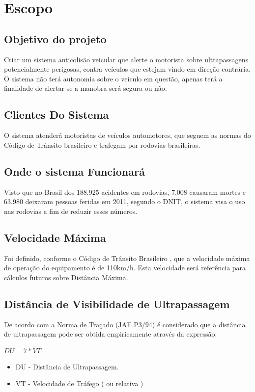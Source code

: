 \chapter[Escopo]{Escopo}

\section{Objetivo do projeto}
Criar um sistema anticolisão veicular que alerte o motorista sobre ultrapassagens potencialmente perigosas, contra veículos que estejam vindo em direção contrária.
O sistema não terá autonomia sobre o veículo em questão, apenas terá a finalidade de alertar se a manobra será segura ou não.

\section{Clientes Do Sistema}
O sistema atenderá motoristas de veículos automotores, que seguem as normas do Código de Trânsito brasileiro e trafegam por rodovias brasileiras.

\section{Onde o sistema Funcionará}
Visto que no Brasil dos 188.925 acidentes em rodovias, 7.008 causaram mortes e 63.980 deixaram pessoas feridas em 2011, segundo o DNIT, o sistema visa o uso nas rodovias a fim de reduzir esses números. \cite{ministerio}

\section{Velocidade Máxima}
Foi definido, conforme o Código de Trânsito Brasileiro \cite{ctb}, que a velocidade máxima de operação do equipamento é de 110km/h.
Esta velocidade será referência para cálculos futuros sobre Distância Máxima.

\section{Distância de Visibilidade de Ultrapassagem}
De acordo com a Norma de Traçado (JAE P3/94) é considerado que a distância  de ultrapassagem pode ser obtida empiricamente através da expressão:

$DU = 7*VT$
\begin{itemize}
  \item DU - Distância de Ultrapassagem.
  \item VT - Velocidade de Tráfego ( ou relativa )
\end{itemize}

